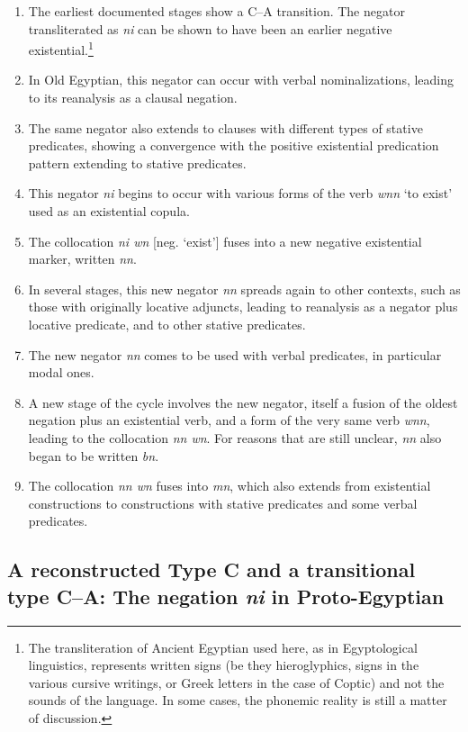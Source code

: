 \documentclass[output=paper,draft,draftmode,colorlinks,citecolor=brown]{langscibook}
\begin{document}
\begin{enumerate}
	\item The earliest documented stages show a C--A transition. The negator transliterated as \textit{ni} can be shown to have been an earlier negative existential.\footnote{The transliteration of Ancient Egyptian used here, as in Egyptological linguistics, represents written signs (be they hieroglyphics, signs in the various cursive writings, or Greek letters in the case of Coptic) and not the sounds of the language. In some cases, the phonemic reality is still a matter of discussion. }
	\item In Old Egyptian, this negator can occur with verbal nominalizations, leading to its reanalysis as a clausal negation.
	\item The same negator also extends to clauses with different types of stative predicates, showing a convergence with the positive existential predication pattern extending to stative predicates.
	\item This negator \textit{ni} begins to occur with various forms of the verb \textit{wnn} ‘to exist’ used as an existential copula.
	\item The collocation \textit{ni wn} [neg. ‘exist’] fuses into a new negative existential marker, written \textit{nn}.
	\item In several stages, this new negator \textit{nn} spreads again to other contexts, such as those with originally locative adjuncts, leading to reanalysis as a negator plus locative predicate, and to other stative predicates.
	\item The new negator \textit{nn} comes to be used with verbal predicates, in particular modal ones.
	\item A new stage of the cycle involves the new negator, itself a fusion of the oldest negation plus an existential verb, and a form of the very same verb \textit{wnn}, leading to the collocation \textit{nn wn}. For reasons that are still unclear, \textit{nn} also began to be written \textit{bn}.
	\item The collocation \textit{nn wn} fuses into \textit{mn}, which also extends from existential constructions to constructions with stative predicates and some verbal predicates.
\end{enumerate}


\subsection{A reconstructed Type C and a transitional type C--A: The negation \textit{ni} in Proto-Egyptian}\label{s:AE2-1}
\end{document}

